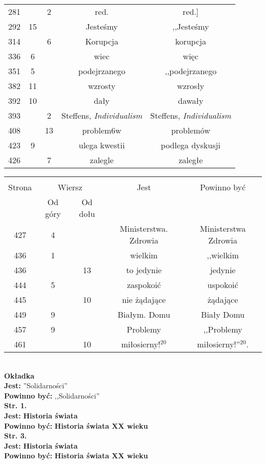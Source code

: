 \documentclass[a4paper,11pt]{article}
\newcommand{\tb}{\textbf}
\newcommand{\noi}{\noindent}
\newcommand{\Str}[1]{\tb{Str. #1.}}
\newcommand{\Jest}{\tb{Jest: }}
\newcommand{\Pow}{\tb{Powinno być: }}
\begin{document}
\begin{center}
\begin{tabular}{|c|c|c|c|c|}
    281 & & 2 & red. & red.] \\
    292 & 15 & & Jesteśmy & ,,Jesteśmy %
    \\
    314 & & 6 & Korupcja & korupcja \\
    336 & 6 & & wiec & więc \\
    351 & 5 & & podejrzanego & ,,podejrzanego %
    \\
    382 & 11 & & wzrosty & wzrosły \\
    392 & 10 & & dały & dawały \\
    393 & & 2 & Steffens,{ }{ }\emph{Individualism}
           & Steffens, \emph{Individualism} \\
    408 & & 13 & problem6w & problemów \\
    423 & 9 & & ulega kwestii & podlega dyskusji \\
    426 & & 7 & zalegle & zaległe \\ \hline
  \end{tabular}
\end{center}

\begin{center}
  \begin{tabular}{|c|c|c|c|c|}
    \hline
    & \multicolumn{2}{c|}{} & & \\
    Strona & \multicolumn{2}{c|}{Wiersz}& Jest & Powinno być \\ \cline{2-3}
    & Od góry & Od dołu & & \\ \hline
    427 & 4 & & Ministerstwa. Zdrowia & Ministerstwa Zdrowia \\
    436 & 1 & & wielkim & ,,wielkim %
    \\
    436 & & 13 & to jedynie & jedynie \\
    444 & 5 & & zaspokoić & uspokoić \\
    445 & & 10 & nie żądające & żądające \\
    449 & 9 & & Białym. Domu & Biały Domu \\
    457 & 9 & & Problemy & ,,Problemy %
    \\
    461 & & 10 & miłosierny!$^{ 20 }$ & miłosierny!''$^{ 20 }$. \\
    \hline
  \end{tabular}
\end{center}
\noi \\
\tb{Okładka} \\
\Jest ''Solidarności'' \\
\Pow ,,Solidarności'' \\
\Str{1} \\
\Jest \tb{Historia świata} \\
\Pow \tb{Historia świata XX wieku} \\
\Str{3} \\
\Jest \tb{Historia świata} \\
\Pow \tb{Historia świata XX wieku} \\
\end{document}
